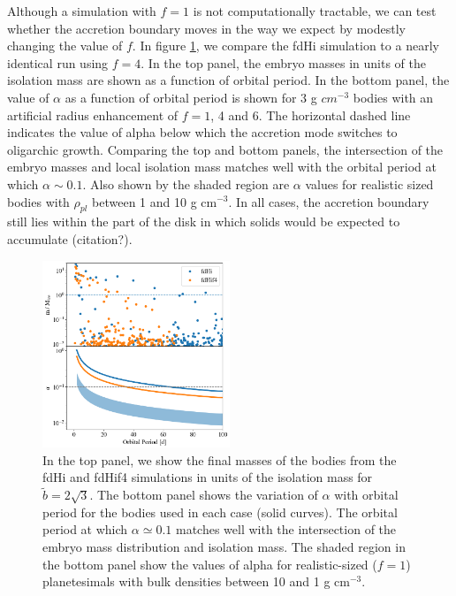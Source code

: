 \documentclass[twocolumn]{aastex63}
\begin{document}
Although a simulation with $f=1$ is not computationally tractable, we
can test whether the accretion boundary moves in the way we expect by
modestly changing the value of $f$. In figure \ref{fig:f6f4}, we
compare the fdHi simulation to a nearly identical run using $f=4$. In
the top panel, the embryo masses in units of the isolation mass are
shown as a function of orbital period. In the bottom panel, the value
of $\alpha$ as a function of orbital period is shown for 3 g $cm^{-3}$
bodies with an artificial radius enhancement of $f=1$, 4 and 6. The
horizontal dashed line indicates the value of alpha below which the
accretion mode switches to oligarchic growth. Comparing the top and
bottom panels, the intersection of the embryo masses and local
isolation mass matches well with the orbital period at which $\alpha
\sim 0.1$.  Also shown by the shaded region are $\alpha$ values for
realistic sized bodies with $\rho_{pl}$ between 1 and 10 g cm$^{-3}$.
In all cases, the accretion boundary still lies within the part of the disk in which solids would be expected to accumulate (citation?).

\begin{figure}
\begin{center}
    \includegraphics[width=0.5\textwidth]{figures/f6f4.png}
    \caption{In the top panel, we show the final masses of the bodies
      from the fdHi and fdHif4 simulations in units of the isolation
      mass for $\tilde{b} = 2\sqrt{3}$. The bottom panel shows the variation of $\alpha$ with orbital period for the bodies used in each case (solid curves). The orbital period at which $\alpha \simeq 0.1$ matches well with the intersection of the embryo mass distribution and isolation mass. The shaded region in the bottom panel show the values of alpha for realistic-sized ($f=1$) planetesimals with bulk densities between 10 and 1 g cm$^{-3}$.\label{fig:f6f4}}
\end{center}
\end{figure}
\end{document}
